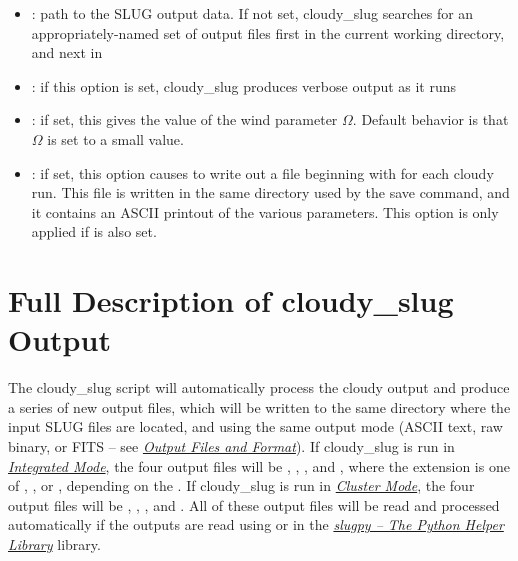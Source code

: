 \documentclass[letterpaper,10pt,english]{sphinxmanual}
\begin{document}
\begin{itemize}
\item {} 
: path to the SLUG output data. If not set,
cloudy\_slug searches for an appropriately-named set of output files
first in the current working directory, and next in

\item {} 
: if this option is set, cloudy\_slug produces
verbose output as it runs

\item {} 
: if set, this gives the
value of the wind parameter \(\Omega\). Default behavior is that
\(\Omega\) is set to a small value.

\item {} 
: if set, this option causes 
to write out a file beginning with  for each
cloudy run. This file is written in the same directory used by the
save command, and it contains an ASCII printout of the various
parameters. This option is only applied if  is also set.

\end{itemize}


\section{Full Description of cloudy\_slug Output}
\label{cloudy:ssec-cloudy-output}\label{cloudy:full-description-of-cloudy-slug-output}
The cloudy\_slug script will automatically process the cloudy output
and produce a series of new output files, which will be written to the
same directory where the input SLUG files are located, and using the
same output mode (ASCII text, raw binary, or FITS -- see
{\hyperref[output:sec\string-output]{\emph{Output Files and Format}}}). If cloudy\_slug is run in
{\hyperref[cloudy:sssec\string-cloudy\string-integrated\string-mode]{\emph{Integrated Mode}}}, the four output files will be
,
,
, and
, where the extension 
is one of , , or , depending on the
. If cloudy\_slug is run in
{\hyperref[cloudy:sssec\string-cloudy\string-cluster\string-mode]{\emph{Cluster Mode}}}, the four output files will be
,
,
, and
. All of these output files will
be read and processed automatically if the outputs are read using
 or  in the {\hyperref[slugpy:sec\string-slugpy]{\emph{slugpy -- The Python Helper Library}}}
library.
\end{document}
